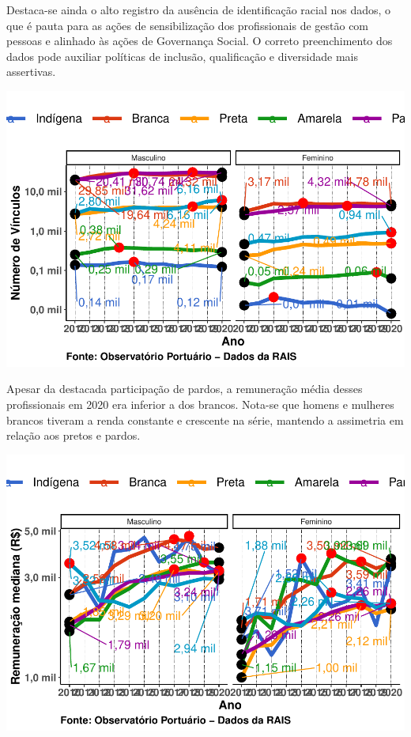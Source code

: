 \documentclass[
]{article}
\begin{document}
Destaca-se ainda o alto registro da ausência de identificação racial nos
dados, o que é pauta para as ações de sensibilização dos profissionais
de gestão com pessoas e alinhado às ações de Governança Social. O
correto preenchimento dos dados pode auxiliar políticas de inclusão,
qualificação e diversidade mais assertivas.

\includegraphics{mercado_trabalho_files/figure-latex/g_operacao_raca_sexo-1.pdf}

Apesar da destacada participação de pardos, a remuneração média desses
profissionais em 2020 era inferior a dos brancos. Nota-se que homens e
mulheres brancos tiveram a renda constante e crescente na série,
mantendo a assimetria em relação aos pretos e pardos.

\includegraphics{mercado_trabalho_files/figure-latex/g_operacao_remuneracao _mediana_raca_sexo-1.pdf}
\end{document}

